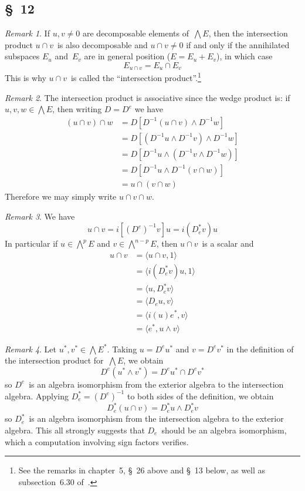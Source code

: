 \documentclass[letterpaper,12pt]{article}
\newcommand{\sect}{\cap}
\newcommand{\eprod}{\wedge}
\newcommand{\bigeprod}{\bigwedge}
\newcommand{\medeprod}{{\textstyle\bigeprod}}
\newcommand{\sprod}[2]{\langle#1,#2\rangle}
\theoremstyle{definition}
\theoremstyle{remark}
\newtheorem*{rmk}{Remark}
\begin{document}
\subsection*{\S~12}
\begin{rmk}
If \(u,v\ne 0\) are decomposable elements of~\(\medeprod E\), then the intersection product \(u\sect v\)~is also decomposable and \(u\sect v\ne 0\) if and only if the annihilated subspaces \(E_u\) and~\(E_v\) are in general position (\(E=E_u+E_v\)), in which case
\[E_{u\sect v}=E_u\sect E_v\]
This is why \(u\sect v\)~is called the ``intersection product''.\footnote{See the remarks in chapter~5, \S~26 above and \S~13 below, as well as subsection~6.30 of~\cite{greub3}.}
\end{rmk}

\begin{rmk}
The intersection product is associative since the wedge product is: if \(u,v,w\in\medeprod E\), then writing \(D=D^e\) we have
\begin{align*}
(u\sect v)\sect w&=D[D^{-1}(u\sect v)\eprod D^{-1}w]\\
	&=D[(D^{-1}u\eprod D^{-1}v)\eprod D^{-1}w]\\
	&=D[D^{-1}u\eprod(D^{-1}v\eprod D^{-1}w)]\\
	&=D[D^{-1}u\eprod D^{-1}(v\sect w)]\\
	&=u\sect(v\sect w)
\end{align*}
Therefore we may simply write \(u\sect v\sect w\).
\end{rmk}

\begin{rmk}
We have
\[u\sect v=i[(D^e)^{-1}v]u=i(D_e^* v)u\]
In particular if \(u\in\medeprod^p E\) and \(v\in\medeprod^{n-p}E\), then \(u\sect v\)~is a scalar and
\begin{align*}
u\sect v&=\sprod{u\sect v}{1}\\
	&=\sprod{i(D_e^* v)u}{1}\\
	&=\sprod{u}{D_e^* v}\\
	&=\sprod{D_e u}{v}\\
	&=\sprod{i(u)e^*}{v}\\
	&=\sprod{e^*}{u\eprod v}
\end{align*}
\end{rmk}

\begin{rmk}
Let \(u^*,v^*\in\medeprod E^*\). Taking \(u=D^e u^*\) and \(v=D^e v^*\) in the definition of the intersection product for~\(\medeprod E\), we obtain
\[D^e(u^*\eprod v^*)=D^e u^*\sect D^e v^*\]
so \(D^e\)~is an algebra isomorphism from the exterior algebra to the intersection algebra. Applying \(D_e^*=(D^e)^{-1}\) to both sides of the definition, we obtain
\[D_e^*(u\sect v)=D_e^* u\eprod D_e^* v\]
so \(D_e^*\)~is an algebra isomorphism from the intersection algebra to the exterior algebra. This all strongly suggests that \(D_e\)~should be an algebra isomorphism, which a computation involving sign factors verifies.
\end{rmk}
\end{document}
